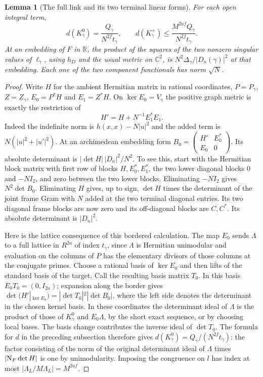 \documentclass[a4paper,11pt]{article}
\newtheorem{lemma}[proposition]{Lemma}
\theoremstyle{definition}
\theoremstyle{remark}
\numberwithin{equation}{section}
\begin{document}
\begin{lemma}[The full link and its two terminal linear forms]
\leavevmode\label{lem:fullborder688}
For each open integral term,
\[
 d(K_\gamma^0)=\frac{Q_\gamma}{N^{2f}t_\gamma},\qquad
 d(K_\gamma^+)\le \frac{M^{2af} Q_\gamma}{N^{2f} t_\gamma}.
\]
At an embedding of \(F\) in \(\mathbb R\), the product of the
squares of the two nonzero singular values of \(\ell_\gamma\),
using \(h_D\) and the usual metric on \(\mathbb C^2\), is
\(N^2\Delta_\gamma/|D_n(\gamma)|^2\) at that embedding.
Each one of the two component functionals has norm \(\sqrt N\).
\end{lemma}
\begin{proof}
Write \(H\) for the ambient Hermitian matrix in rational
coordinates, \(P=P_\gamma\), \(Z=Z_\gamma\), \(E_0=P^*H\) and
\(E_1=Z^*H\). On \(\ker E_0=V_\gamma\) the positive graph metric
is exactly the restriction of
\[
                  H'=H+N^{-1}E_1^*E_1 .
\]
Indeed the indefinite norm is \(h(x,x)-N|u|^2\) and the added
term is \(N(|u|^2+|u'|^2)\). At an archimedean embedding form
\(B_0=\left(\begin{smallmatrix}H'&E_0^*\\E_0&0\end{smallmatrix}\right)\).
Its absolute determinant is \(|\det H|\,|D_n|^2/N^2\). To see
this, start with the Hermitian block matrix with first row of
blocks \(H,E_0^*,E_1^*\), the two lower diagonal blocks \(0\)
and \(-NI_2\), and zero between the two lower blocks. Eliminating
\(-NI_2\) gives \(N^2\det B_0\). Eliminating \(H\) gives, up to
sign, \(\det H\) times the determinant of the joint frame Gram
with \(N\) added at the two terminal diagonal entries. Its two
diagonal frame blocks are now zero and its off-diagonal blocks
are \(C,C^*\). Its absolute determinant is \(|D_n|^2\).

Here is the lattice consequence of this bordered calculation.
The map \(E_0\) sends \(\Lambda\) to a full lattice in \(R^{2a}\)
of index \(t_\gamma\), since \(\Lambda\) is Hermitian unimodular
and evaluation on the columns of \(P\) has the elementary
divisors of those columns at the conjugate primes. Choose a
rational basis of \(\ker E_0\) and then lifts of the standard
basis of the target. Call the resulting basis matrix \(T_0\).
In this basis \(E_0T_0=(0,I_{2a})\); expansion along the
border gives
\(\det(H'|_{\ker E_0})=|\det T_0|^2|\det B_0|\), where the
left side denotes the determinant in the chosen kernel basis.
In these coordinates the determinant ideal of \(\Lambda\) is
the product of those of \(K_\gamma^0\) and \(E_0\Lambda\),
by the short exact sequence, or by choosing local bases.
The basis change contributes the inverse ideal of \(\det T_0\).
The formula for \(d\) in the preceding subsection therefore
gives \(d(K_\gamma^0)=Q_\gamma/(N^{2f}t_\gamma)\):
the factor consisting of the norm of the original determinant
ideal of \(\Lambda\) times \(|{\rm N}_F\det H|\) is one by
unimodularity. Imposing the congruence on \(l\) has index at
most \(|\Lambda_L/M\Lambda_L|=M^{2af}\).


\end{proof}
\end{document}
